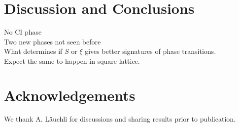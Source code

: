 \documentclass[aps,prx,10pt,twocolumn,floatfix,superscriptaddress,showpacs,numerical,footinbib]{revtex4-1}
\begin{document}
% 




%
\section{\label{sec:discconc}Discussion and Conclusions}
%



No CI phase\\
%
Two new phases not seen before\\
%
What determines if $S$ or $\xi$ gives better signatures of phase transitions. \\
%
Expect the same to happen in square lattice.

\section{Acknowledgements}

We thank A. Läuchli for discussions and sharing results prior to publication.


\end{document}
